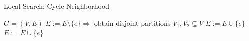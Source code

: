 \begin{frame}{Local Search: Cycle Neighborhood}
  \begin{algorithm}[H]
    \footnotesize
    \caption{Local search: Cycle Neighborhood for Spanning Trees}
    \begin{algorithmic}[1]
      \State {}
      \EndFor
      \EndWhile
      \State \Return $G=(V,E)$
      \EndFunction
      \State
      \State $E := E\setminus\{e\}\Rightarrow$ obtain disjoint partitions $V_1,V_2\subseteq V$
      \State $E:=E\cup\{e\}$
      \State \Return
      \EndIf
      \EndFor
      \State $E := E\cup \{e\}$
      \State \Return
      \EndFunction
    \end{algorithmic}
  \end{algorithm}
\end{frame}